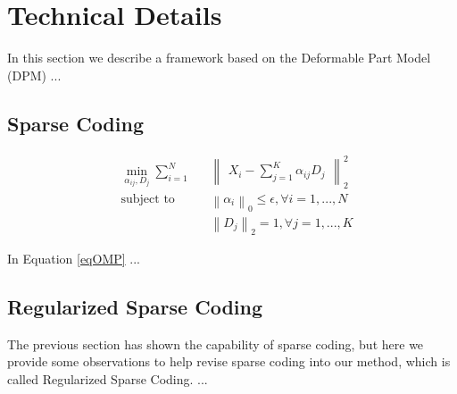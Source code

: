 \chapter{Technical Details}
\label{c:tech}

In this section we describe a framework based on the Deformable Part Model (DPM) ...

\section{Sparse Coding}

\begin{equation} \label{eqOMP}
  \begin{aligned}
    & \min_{\alpha_{ij}, D_j}\sum
    _{i=1}^N&&\begin{Vmatrix}X_i-\sum_{j=1}^K\alpha_{ij}D_j\end{Vmatrix}_2^2\\
    & \text{subject to} && \left \| \alpha_i \right \|_0 \leq 
    \epsilon, \forall i=1,...,N\\
    &&& \left \|D_j \right \|_2 = 1, \forall j=1,...,K
  \end{aligned}
\end{equation}
%

In Equation \ref{eqOMP} ...

\section{Regularized Sparse Coding} \label{secRSC}

The previous section has shown the capability of sparse coding, but here we provide some observations to help revise sparse coding into our method, which is called Regularized Sparse Coding. ...
